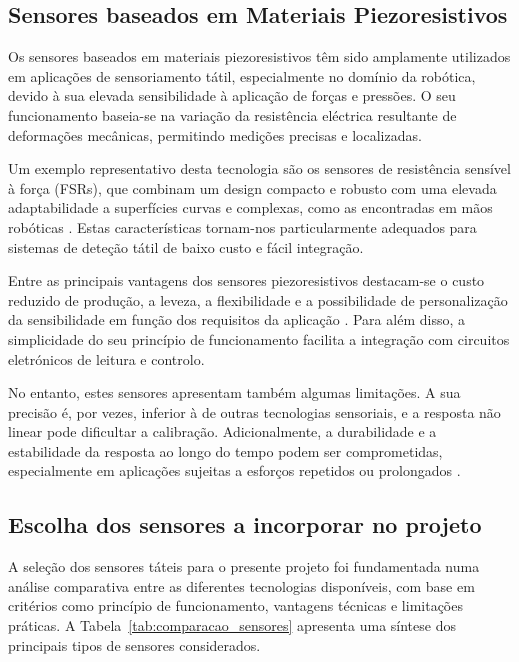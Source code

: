 \subsection{Sensores baseados em Materiais Piezoresistivos}

Os sensores baseados em materiais piezoresistivos têm sido amplamente utilizados em aplicações de sensoriamento tátil, especialmente no domínio da robótica, devido à sua elevada sensibilidade à aplicação de forças e pressões. O seu funcionamento baseia-se na variação da resistência eléctrica resultante de deformações mecânicas, permitindo medições precisas e localizadas.

Um exemplo representativo desta tecnologia são os sensores de resistência sensível à força (\acp{FSR}), que combinam um design compacto e robusto com uma elevada adaptabilidade a superfícies curvas e complexas, como as encontradas em mãos robóticas \cite{Ke2019, Lu2023}. Estas características tornam-nos particularmente adequados para sistemas de deteção tátil de baixo custo e fácil integração.

Entre as principais vantagens dos sensores piezoresistivos destacam-se o custo reduzido de produção, a leveza, a flexibilidade e a possibilidade de personalização da sensibilidade em função dos requisitos da aplicação \cite{Stassi2014}. Para além disso, a simplicidade do seu princípio de funcionamento facilita a integração com circuitos eletrónicos de leitura e controlo.

No entanto, estes sensores apresentam também algumas limitações. A sua precisão é, por vezes, inferior à de outras tecnologias sensoriais, e a resposta não linear pode dificultar a calibração. Adicionalmente, a durabilidade e a estabilidade da resposta ao longo do tempo podem ser comprometidas, especialmente em aplicações sujeitas a esforços repetidos ou prolongados \cite{Ke2019}.

    


\subsection{Escolha dos sensores a incorporar no projeto}

A seleção dos sensores táteis para o presente projeto foi fundamentada numa análise comparativa entre as diferentes tecnologias disponíveis, com base em critérios como princípio de funcionamento, vantagens técnicas e limitações práticas. A Tabela~\ref{tab:comparacao_sensores} apresenta uma síntese dos principais tipos de sensores considerados.

